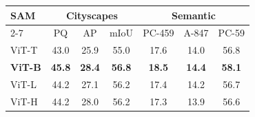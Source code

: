 \begin{table}[!htbp]\centering
    \vspace{0.5em}\centering\wuhao
    \begin{tabular}{lcccccc}
        \toprule
        \multirow{2}{*}{SAM} & \multicolumn{3}{c}{Cityscapes} & \multicolumn{3}{c}{Semantic} \\
        \cline{2-7}
         & PQ & AP & mIoU & PC-459 & A-847 & PC-59 \\
        \midrule
        ViT-T & 43.0 & 25.9 & 55.0 & 17.6 & 14.0 & 56.8 \\
        \textbf{ViT-B} & \textbf{45.8} & \textbf{28.4} & \textbf{56.8} & \textbf{18.5} & \textbf{14.4} & \textbf{58.1} \\
        ViT-L & 44.2 & 27.1 & 56.2 & 17.4 & 14.2 & 56.7 \\
        ViT-H & 44.2 & 28.0 & 56.2 & 17.3 & 13.9 & 56.6 \\
        \bottomrule
\end{tabular}
\end{table}
